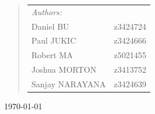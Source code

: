 \documentclass[12pt]{article}
\begin{document}
\begin{center}
\begin{quote}
\begin{table}[!htb]
\centering
\begin{tabular}{lr}             \large
\emph{Authors:} & \hspace{8.5cm} \\[0.2cm] \large
Daniel \textsc{BU}        & z3424724\\ \large
Paul \textsc{JUKIC}       & z3424666\\ \large
Robert \textsc{MA}        & z5021455\\ \large
Joshua \textsc{MORTON}    & z3413752\\ \large
Sanjay \textsc{NARAYANA}  & z3424639\\

\end{tabular}
\end{table}
\end{quote}

\vfill

{\large \today}
\end{center}

\pagebreak
\end{document}
